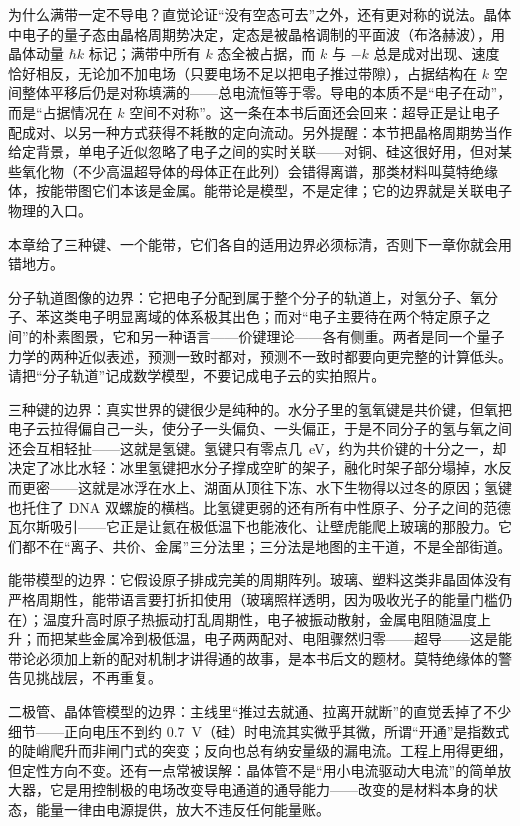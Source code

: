 \begin{challenge}
为什么满带一定不导电？直觉论证“没有空态可去”之外，还有更对称的说法。晶体中电子的量子态由晶格周期势决定，定态是被晶格调制的平面波（布洛赫波），用晶体动量 \(\hbar k\) 标记；满带中所有 \(k\) 态全被占据，而 \(k\) 与 \(-k\) 总是成对出现、速度恰好相反，无论加不加电场（只要电场不足以把电子推过带隙），占据结构在 \(k\) 空间整体平移后仍是对称填满的——总电流恒等于零。导电的本质不是“电子在动”，而是“占据情况在 \(k\) 空间不对称”。这一条在本书后面还会回来：超导正是让电子配成对、以另一种方式获得不耗散的定向流动。另外提醒：本节把晶格周期势当作给定背景，单电子近似忽略了电子之间的实时关联——对铜、硅这很好用，但对某些氧化物（不少高温超导体的母体正在此列）会错得离谱，那类材料叫莫特绝缘体，按能带图它们本该是金属。能带论是模型，不是定律；它的边界就是关联电子物理的入口。
\end{challenge}


本章给了三种键、一个能带，它们各自的适用边界必须标清，否则下一章你就会用错地方。

分子轨道图像的边界：它把电子分配到属于整个分子的轨道上，对氢分子、氧分子、苯这类电子明显离域的体系极其出色；而对“电子主要待在两个特定原子之间”的朴素图景，它和另一种语言——价键理论——各有侧重。两者是同一个量子力学的两种近似表述，预测一致时都对，预测不一致时都要向更完整的计算低头。请把“分子轨道”记成数学模型，不要记成电子云的实拍照片。

三种键的边界：真实世界的键很少是纯种的。水分子里的氢氧键是共价键，但氧把电子云拉得偏自己一头，使分子一头偏负、一头偏正，于是不同分子的氢与氧之间还会互相轻扯——这就是氢键。氢键只有零点几~eV，约为共价键的十分之一，却决定了冰比水轻：冰里氢键把水分子撑成空旷的架子，融化时架子部分塌掉，水反而更密——这就是冰浮在水上、湖面从顶往下冻、水下生物得以过冬的原因；氢键也托住了 DNA 双螺旋的横档。比氢键更弱的还有所有中性原子、分子之间的范德瓦尔斯吸引——它正是让氦在极低温下也能液化、让壁虎能爬上玻璃的那股力。它们都不在“离子、共价、金属”三分法里；三分法是地图的主干道，不是全部街道。

能带模型的边界：它假设原子排成完美的周期阵列。玻璃、塑料这类非晶固体没有严格周期性，能带语言要打折扣使用（玻璃照样透明，因为吸收光子的能量门槛仍在）；温度升高时原子热振动打乱周期性，电子被振动散射，金属电阻随温度上升；而把某些金属冷到极低温，电子两两配对、电阻骤然归零——超导——这是能带论必须加上新的配对机制才讲得通的故事，是本书后文的题材。莫特绝缘体的警告见挑战层，不再重复。

二极管、晶体管模型的边界：主线里“推过去就通、拉离开就断”的直觉丢掉了不少细节——正向电压不到约 \(0.7\)~V（硅）时电流其实微乎其微，所谓“开通”是指数式的陡峭爬升而非闸门式的突变；反向也总有纳安量级的漏电流。工程上用得更细，但定性方向不变。还有一点常被误解：晶体管不是“用小电流驱动大电流”的简单放大器，它是用控制极的电场改变导电通道的通导能力——改变的是材料本身的状态，能量一律由电源提供，放大不违反任何能量账。

